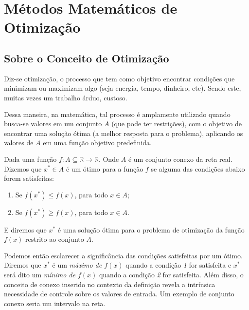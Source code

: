 

\chapter{\Large{Métodos Matemáticos de Otimização}}\label{chp:1}


\section{{Sobre o Conceito de Otimização}}

\hspace{0.8cm}
Diz-se otimização, o processo que tem como objetivo encontrar condições que
minimizam ou maximizam algo (seja energia, tempo, dinheiro, etc). Sendo este,
muitas vezes um trabalho árduo, custoso.

Dessa maneira, na matemática, tal processo é amplamente utilizado quando
busca-se valores em um conjunto \( A \) (que pode ter restrições), com o
objetivo de encontrar uma solução ótima (a melhor resposta para o problema),
aplicando os valores de \( A \) em uma função objetivo predefinida.


\begin{definition}
    Dada uma função  \( f : A \subseteq \mathbb{R} \rightarrow \mathbb{R}. \)
    Onde \( A \) é um conjunto  conexo da reta real.
    Dizemos que \( x^* \in A \) é um ótimo para a função \( f \) se alguma das
    condições abaixo forem satisfeitas:
    \begin{enumerate}
        \item Se \( f(x^*) \leq f(x) \), para todo \( x \in A \);
        \item Se \( f(x^*) \geq f(x) \), para todo \( x \in A \).
    \end{enumerate}

    E diremos que \( x^* \) é uma solução ótima para o problema de otimização da
    função \( f(x) \) restrito ao conjunto \( A \).

\end{definition}

Podemos então esclarecer a significância das condições satisfeitas por um ótimo.
Diremos que \( x^* \) é um \textit{máximo de \( f(x) \)} quando a condição
\textit{1} for satisfeita e \( x^* \) será dito um \textit{mínimo de \( f(x) \)}
quando a condição \textit{2} for satisfeita. Além disso, o conceito de conexo
inserido no contexto da definição revela a intrínsica necessidade de controle
sobre os valores de entrada. Um exemplo de conjunto conexo seria um intervalo
na reta.

